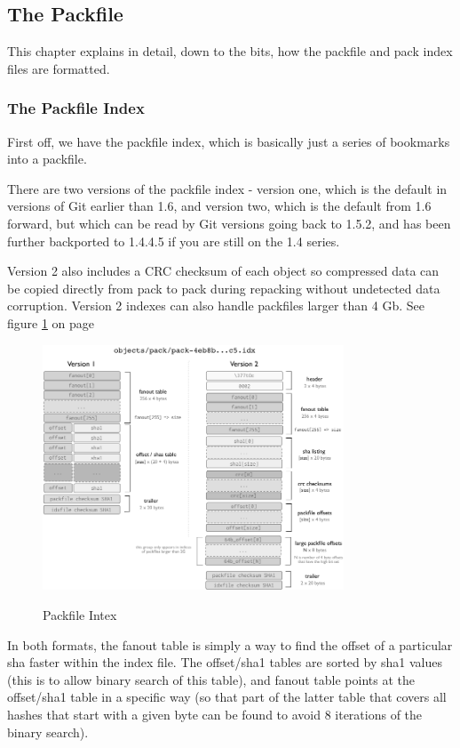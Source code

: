 \subsection{The Packfile}
This chapter explains in detail, down to the bits, how the packfile and pack
index files are formatted.

\subsubsection{The Packfile Index}
First off, we have the packfile index, which is basically just a series of
bookmarks into a packfile.

There are two versions of the packfile index - version one, which is the
default in versions of Git earlier than 1.6, and version two, which is the
default from 1.6 forward, but which can be read by Git versions going back to
1.5.2, and has been further backported to 1.4.4.5 if you are still on the 1.4
series.

Version 2 also includes a CRC checksum of each object so compressed data can be
copied directly from pack to pack during repacking without undetected data
corruption. Version 2 indexes can also handle packfiles larger than 4 Gb. See
figure \ref{fig:packfileindex} on page \pageref{fig:packfileindex}
\begin{figure}[tbp]
\centering
\includegraphics[width=0.80\textwidth]{content/git/packfile-index.png}
\label{fig:packfileindex}
\caption{Packfile Intex}
\end{figure}

In both formats, the fanout table is simply a way to find the offset of a
particular sha faster within the index file. The offset/sha1 tables are sorted
by sha1 values (this is to allow binary search of this table), and fanout table
points at the offset/sha1 table in a specific way (so that part of the latter
table that covers all hashes that start with a given byte can be found to avoid
8 iterations of the binary search).

